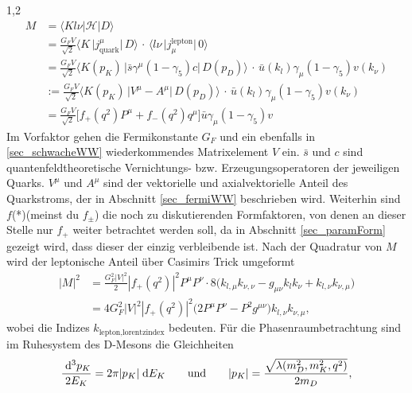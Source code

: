 \documentclass[11pt,a4paper,twoside]{report}
\begin{document}
\begin{spacing}{1,2}
\begin{align}
 M &= \big\langle Kl\nu|\mathcal{H}|D\big\rangle\nonumber\\
 &= \frac{G_F V}{\sqrt{2}}\big\langle K\, \big|j_\text{quark}^\mu\big|\,D \big\rangle \,\cdot\,\big\langle l\nu\,\big|j_\mu^\text{lepton}\big|\,0\big\rangle\nonumber\\
 &= \frac{G_F V}{\sqrt{2}}\big\langle K(p_K)\, \big|\bar s \gamma^\mu(1-\gamma_5) c \big|\,D(p_D) \big\rangle \, \cdot \,\bar u(k_l) \gamma_\mu(1-\gamma_5)v(k_\nu)\nonumber\\
 &:= \frac{G_F V}{\sqrt{2}}\big\langle K(p_K)\, \big|V^\mu - A^\mu\big|\,D(p_D) \big\rangle \, \cdot \,\bar u(k_l) \gamma_\mu(1-\gamma_5)v(k_\nu)\nonumber\\
 &=\frac{G_F V}{\sqrt{2}} \big[f_+(q^2) P^\mu  + f_-(q^2) q^\mu\big] \bar u \gamma_\mu(1-\gamma_5)v
 \label{eq_fermiMG_F}
 \end{align}
Im Vorfaktor gehen die Fermikonstante $G_F$ und ein ebenfalls in \ref{sec_schwacheWW} wiederkommendes Matrixelement $V$ ein. $\bar s$ und $c$ sind quantenfeldtheoretische 
Vernichtungs- bzw. Erzeugungsoperatoren der jeweiligen Quarks. $V^\mu$ und $A^\mu$ sind der vektorielle und axialvektorielle Anteil des Quarkstroms, der 
in Abschnitt \ref{sec_fermiWW} beschrieben wird. Weiterhin sind $f$(*)(meinst du $f_\pm$) die noch zu
diskutierenden Formfaktoren, von denen an dieser Stelle nur $f_+$ weiter betrachtet werden soll, da in Abschnitt \ref{sec_paramForm} gezeigt wird, dass dieser
der einzig verbleibende ist. Nach der Quadratur von $M$ wird der leptonische Anteil über 
Casimirs Trick \cite{Griffiths} umgeformt
\begin{align}
 \big|M\big|^2 &= \frac{G_F^2|V|^2}{2}|f_+(q^2)|^2 P^\mu P^\nu \cdot 8\big(k_{l,\mu} k_{\nu,\nu} - g_{\mu\nu}k_lk_\nu + k_{l,\nu}k_{\nu,\mu}\big)\nonumber\\
 &=4G_F^2|V|^2 |f_+(q^2)|^2 \big(2P^\mu P^\nu - P^2 g^{\mu\nu}\big) k_{l,\nu}k_{\nu,\mu},
 \label{eq_fermiMelement}
\end{align}
wobei die Indizes $k_{\text{lepton},\text{lorentzindex}}$ bedeuten. Für die Phasenraumbetrachtung sind im Ruhesystem des D-Mesons die Gleichheiten
\begin{align}
 \frac{\dx^3 p_K}{2E_K} = 2\pi |p_K| \dx E_K \qquad \text{und} \qquad |p_K| = \frac{\sqrt{\lambda(m_D^2,m_K^2,q^2)}}{2m_D},

\end{align}
\end{spacing}
\end{document}

